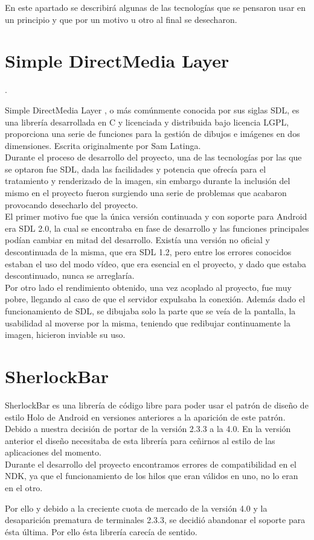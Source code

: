 En este apartado se describirá algunas de las tecnologías que se pensaron usar en un principio y que por un motivo u otro al final se desecharon.

\section{Simple DirectMedia Layer}.

Simple DirectMedia Layer \cite{sdl:sdl}, o más comúnmente conocida por sus siglas SDL, es una librería desarrollada en C y licenciada y distribuida bajo licencia LGPL, proporciona una serie de funciones para la gestión de dibujos e imágenes en dos dimensiones. Escrita originalmente por Sam Latinga.\\

Durante el proceso de desarrollo del proyecto, una de las tecnologías por las que se optaron fue SDL, dada las facilidades y potencia que ofrecía para el tratamiento y renderizado de la imagen, sin embargo durante la inclusión del mismo en el proyecto fueron surgiendo una serie de problemas que acabaron provocando desecharlo del proyecto.\\

El primer motivo fue que la única versión continuada y con soporte para Android era SDL 2.0, la cual se encontraba en fase de desarrollo y las funciones principales podían cambiar en mitad del desarrollo. Existía una versión no oficial y descontinuada de la misma, que era SDL 1.2, pero entre los errores conocidos estaban el uso del modo vídeo, que era esencial en el proyecto, y dado que estaba descontinuado, nunca se arreglaría.\\

Por otro lado el rendimiento obtenido, una vez acoplado al proyecto, fue muy pobre, llegando al caso de que el servidor expulsaba la conexión. Además dado el funcionamiento de SDL, se dibujaba solo la parte que se veía de la pantalla, la usabilidad al moverse por la misma, teniendo que redibujar continuamente la imagen, hicieron inviable su uso.

\section{SherlockBar}

SherlockBar\cite{sherlock:sherlock} es una librería de código libre para poder usar el patrón de diseño de estilo Holo de Android en versiones anteriores a la aparición de este patrón. Debido a nuestra decisión de portar de la versión 2.3.3 a la 4.0. En la versión anterior el diseño necesitaba de esta librería para ceñirnos al estilo de las aplicaciones del momento.\\

Durante el desarrollo del proyecto encontramos errores de compatibilidad en el NDK, ya que el funcionamiento de los hilos que eran válidos en uno, no lo eran en el otro.

Por ello y debido a la creciente cuota de mercado de la versión 4.0 y la desaparición prematura de terminales 2.3.3, se decidió abandonar el soporte para ésta última. Por ello ésta librería carecía de sentido.
